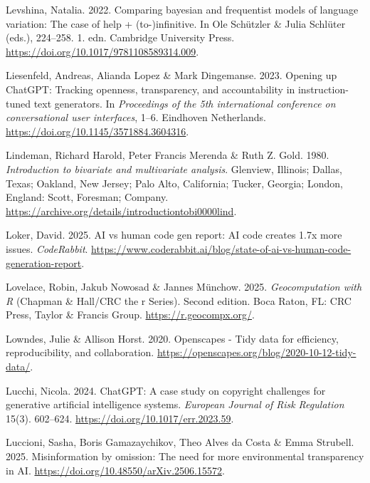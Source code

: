 \documentclass[
  letterpaper,
  DIV=11,
  numbers=noendperiod]{scrreprt}
\newlength{\cslhangindent}
\newenvironment{CSLReferences}[2] %
 {\begin{list}{}{%
  \setlength{\itemindent}{0pt}
  \setlength{\leftmargin}{0pt}
  \setlength{\parsep}{0pt}
  \ifodd #1
   \setlength{\leftmargin}{\cslhangindent}
   \setlength{\itemindent}{-1\cslhangindent}
  \fi
  \setlength{\itemsep}{#2\baselineskip}}}
 {\end{list}}
\begin{document}
\begin{CSLReferences}{1}{0}
Levshina, Natalia. 2022. Comparing bayesian and frequentist models of
language variation: The case of help + (to-)infinitive. In Ole Schützler
\& Julia Schlüter (eds.), 224--258. 1. edn. Cambridge University Press.
\url{https://doi.org/10.1017/9781108589314.009}.

Liesenfeld, Andreas, Alianda Lopez \& Mark Dingemanse. 2023. Opening up
ChatGPT: Tracking openness, transparency, and accountability in
instruction-tuned text generators. In \emph{Proceedings of the 5th
international conference on conversational user interfaces}, 1--6.
Eindhoven Netherlands. \url{https://doi.org/10.1145/3571884.3604316}.

Lindeman, Richard Harold, Peter Francis Merenda \& Ruth Z. Gold. 1980.
\emph{Introduction to bivariate and multivariate analysis}. Glenview,
Illinois; Dallas, Texas; Oakland, New Jersey; Palo Alto, California;
Tucker, Georgia; London, England: Scott, Foresman; Company.
\url{https://archive.org/details/introductiontobi0000lind}.

Loker, David. 2025. AI vs human code gen report: AI code creates 1.7x
more issues. \emph{CodeRabbit}.
\url{https://www.coderabbit.ai/blog/state-of-ai-vs-human-code-generation-report}.

Lovelace, Robin, Jakub Nowosad \& Jannes Münchow. 2025.
\emph{Geocomputation with {R}} (Chapman \& Hall/CRC the r Series).
Second edition. Boca Raton, FL: CRC Press, Taylor \& Francis Group.
\url{https://r.geocompx.org/}.

Lowndes, Julie \& Allison Horst. 2020. Openscapes - {Tidy} data for
efficiency, reproducibility, and collaboration.
\url{https://openscapes.org/blog/2020-10-12-tidy-data/}.

Lucchi, Nicola. 2024. ChatGPT: A case study on copyright challenges for
generative artificial intelligence systems. \emph{European Journal of
Risk Regulation} 15(3). 602--624.
\url{https://doi.org/10.1017/err.2023.59}.

Luccioni, Sasha, Boris Gamazaychikov, Theo Alves da Costa \& Emma
Strubell. 2025. Misinformation by omission: The need for more
environmental transparency in AI.
\url{https://doi.org/10.48550/arXiv.2506.15572}.


\end{CSLReferences}
\end{document}
